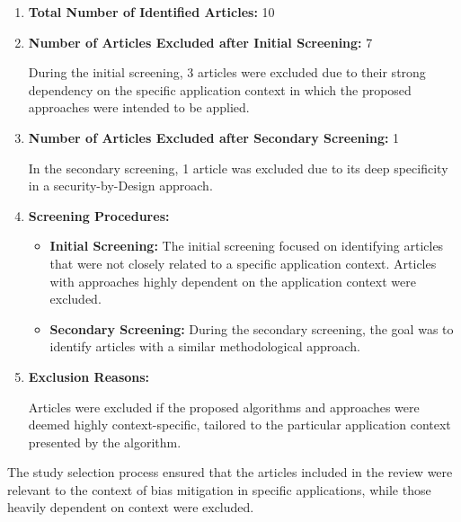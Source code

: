 \documentclass{article}
\begin{document}
    \begin{enumerate}
        \item \textbf{Total Number of Identified Articles:} 10
        \item \textbf{Number of Articles Excluded after Initial Screening:} 7
        
        During the initial screening, 3 articles were excluded due to their strong dependency on the specific application context in which the proposed approaches were intended to be applied.
        
        \item \textbf{Number of Articles Excluded after Secondary Screening:} 1
        
        In the secondary screening, 1 article was excluded due to its deep specificity in a security-by-Design approach.
        
        \item \textbf{Screening Procedures:}
        
        \begin{itemize}
            \item \textbf{Initial Screening:} The initial screening focused on identifying articles that were not closely related to a specific application context. Articles with approaches highly dependent on the application context were excluded.
            
            \item \textbf{Secondary Screening:} During the secondary screening, the goal was to identify articles with a similar methodological approach.
        \end{itemize}
        
        \item \textbf{Exclusion Reasons:}
        
        Articles were excluded if the proposed algorithms and approaches were deemed highly context-specific, tailored to the particular application context presented by the algorithm.
    
    \end{enumerate}
    
    The study selection process ensured that the articles included in the review were relevant to the context of bias mitigation in specific applications, while those heavily dependent on context were excluded.
\end{document}
